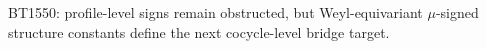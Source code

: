 \begin{center}\small
BT1550: profile-level signs remain obstructed, but Weyl-equivariant $\mu$-signed structure constants define the next cocycle-level bridge target.
\end{center}
